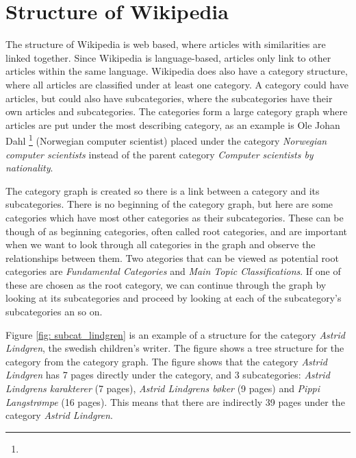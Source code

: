 \section{Structure of Wikipedia}
The structure of Wikipedia is web based, where articles with similarities are linked together. Since Wikipedia is language-based, articles only link to other articles within the same language. Wikipedia does also have a category structure, where all articles are classified under at least one category. A category could have articles, but could also have subcategories, where the subcategories have their own articles and subcategories. The categories form a large category graph where articles are put under the most describing category, as an example is Ole Johan Dahl \footnote{\olejohandahleng} (Norwegian computer scientist) placed under the category \textit{Norwegian computer scientists} instead of the parent category \textit{Computer scientists by nationality}. 

The category graph is created so there is a link between a category and its subcategories. There is no beginning of the category graph, but here are some categories which have most other categories as their subcategories. These can be though of as beginning categories, often called root categories, and are important when we want to look through all categories in the graph and observe the relationships between them.  Two ategories that can be viewed as potential root categories are \textit{Fundamental Categories} and \textit{Main Topic Classifications}. If one of these are chosen as the root category, we can continue through the graph by looking at its subcategories and proceed by looking at each of the subcategory's subcategories an so on.

Figure \ref{fig: subcat_lindgren} is an example of a structure for the category \textit{Astrid Lindgren}, the swedish children's writer. The figure shows a tree structure for the category from the category graph. The figure shows that the category \textit{Astrid Lindgren} has 7 pages directly under the category, and 3 subcategories: \textit{Astrid Lindgrens karakterer} (7 pages), \textit{Astrid Lindgrens bøker} (9 pages) and \textit{Pippi Langstrømpe} (16 pages).  This means that there are indirectly 39 pages under the category \textit{Astrid Lindgren}. 



